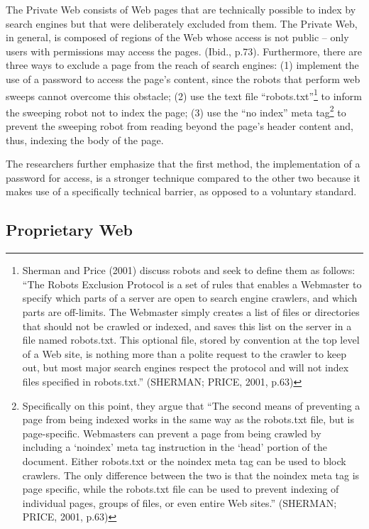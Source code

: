 The Private Web consists of Web pages that are technically possible to index by search engines but that were deliberately excluded from them. The Private Web, in general, is composed of regions of the Web whose access is not public -- only users with permissions may access the pages. (Ibid., p.73). Furthermore, there are three ways to exclude a page from the reach of search engines: (1) implement the use of a password to access the page's content, since the robots that perform web sweeps cannot overcome this obstacle; (2) use the text file ``robots.txt''\footnote{Sherman and Price (2001) discuss robots and seek to define them as follows: ``The Robots Exclusion Protocol is a set of rules that enables a Webmaster to specify which parts of a server are open to search engine crawlers, and which parts are off-limits. The Webmaster simply creates a list of files or directories that should not be crawled or indexed, and saves this list on the server in a file named robots.txt. This optional file, stored by convention at the top level of a Web site, is nothing more than a polite request to the crawler to keep out, but most major search engines respect the protocol and will not index files specified in robots.txt.'' (SHERMAN; PRICE, 2001, p.63)} to inform the sweeping robot not to index the page; (3) use the ``no index'' meta tag\footnote{Specifically on this point, they argue that ``The second means of preventing a page from being indexed works in the same way as the robots.txt file, but is page-specific. Webmasters can prevent a page from being crawled by including a `noindex' meta tag instruction in the `head' portion of the document. Either robots.txt or the noindex meta tag can be used to block crawlers. The only difference between the two is that the noindex meta tag is page specific, while the robots.txt file can be used to prevent indexing of individual pages, groups of files, or even entire Web sites.'' (SHERMAN; PRICE, 2001, p.63)} to prevent the sweeping robot from reading beyond the page's header content and, thus, indexing the body of the page.

The researchers further emphasize that the first method, the implementation of a password for access, is a stronger technique compared to the other two because it makes use of a specifically technical barrier, as opposed to a voluntary standard.

\subsection{Proprietary Web}

